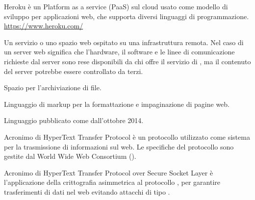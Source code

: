 Heroku è un Platform as a service (PaaS) sul cloud usato come modello di sviluppo per applicazioni web, che supporta diversi linguaggi di programmazione.\\
\url{https://www.heroku.com/}

Un servizio o uno spazio web ospitato su una infrastruttura remota.
Nel caso di un server web significa che l’hardware, il software e le linee di comunicazione richieste dal server sono rese disponibili da chi offre il servizio di , ma il contenuto del server potrebbe essere controllato da terzi.

Spazio per l’archiviazione di file.

Linguaggio di markup per la formattazione e impaginazione di pagine web.

Linguaggio  pubblicato come  dall'ottobre 2014.

Acronimo di HyperText Transfer Protocol è un protocollo utilizzato come sistema per la trasmissione di informazioni sul web. Le specifiche del protocollo sono gestite dal World Wide Web Consortium ().

Acronimo di  HyperText Transfer Protocol over Secure Socket Layer è l'applicazione della crittografia asimmetrica al protocollo , per garantire trasferimenti di dati nel web evitando attacchi di tipo .
\clearpage